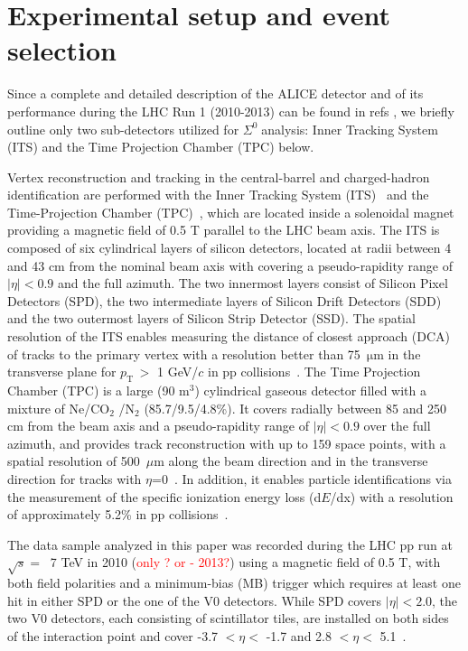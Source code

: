 \documentclass[ALICE,manyauthors]{cernphprep}
\newcommand{\sqs}{\ensuremath{\sqrt{s} =  \;\; }}
\newcommand{\sig}{\ensuremath{\Sigma^0  \; }}
\newcommand{\pt}{\ensuremath{p_{\mathrm{T}\; }}}
\newcommand{\red}{\textcolor{red}}
\begin{document}
 \section{ Experimental setup and event selection}
 \label{sec:exp}
 
Since a complete and detailed description of the ALICE detector and of its performance 
 during the LHC Run 1 (2010-2013) can be found in refs \cite{cite:ALICE,cite:ALICEPerformance}, 
 we briefly outline only two sub-detectors utilized for \sig analysis:
Inner Tracking System (ITS) and the Time Projection Chamber (TPC) below. 

Vertex reconstruction and tracking in the central-barrel  and charged-hadron identification are performed with the
Inner Tracking System (ITS)~\cite{cite:ALICE} and the Time-Projection Chamber (TPC)~\cite{cite:TPC}, 
which are located inside a solenoidal magnet providing a magnetic field of 0.5 T parallel to the LHC beam axis. 
The ITS is composed of six cylindrical layers of silicon detectors, located at radii between 4 and 43 cm from
the nominal beam axis with covering a pseudo-rapidity range of $|\eta|<0.9$ and the full azimuth. The two innermost layers
consist of Silicon Pixel Detectors (SPD), the two intermediate layers of Silicon Drift Detectors (SDD) and the two outermost
layers of Silicon Strip Detector (SSD). The spatial resolution of the ITS enables measuring the distance of closest approach 
(DCA) of tracks to the primary vertex with a resolution better than 75~$\mathrm{\mu}$m in the transverse plane for \pt $>$ 
1 GeV/$c$ in pp collisions~\cite{cite:Xi_c}. 
The Time Projection Chamber (TPC) is a large (90 m$^3$)
cylindrical gaseous detector filled with a mixture of Ne/CO$_2$ /N$_2$ (85.7/9.5/4.8\%). It covers radially between 85 and 250 cm from the 
beam axis and a pseudo-rapidity range of $|\eta| < 0.9$ over the full azimuth, and provides track reconstruction with up to 
159 space points, with a spatial resolution of 500~$\mu$m along the beam direction and in the transverse direction for tracks 
with $\eta$=0~\cite{cite:TPC}. In addition, it enables particle identifications via the measurement of the specific 
ionization energy loss (d$E$/dx) with a resolution of approximately 5.2\% in pp collisions~\cite{cite:ALICEPerformance}.

The data sample analyzed in this paper was recorded during the LHC pp run
at \sqs 7 TeV in 2010 (\red{only ? or - 2013?}) using a magnetic field of 0.5 T, with both field polarities 
and a minimum-bias (MB) trigger which requires at least one hit in either SPD or the one of the V0 detectors. While 
SPD covers $|\eta|<2.0$, the two V0 detectors, each consisting of scintillator tiles, are installed on both sides of the interaction 
point and cover -3.7 $< \eta <$ -1.7 and 2.8 $< \eta <$ 5.1~\cite{cite:ALICE2010-ChargeMult,cite:pi0-2012,
cite:ALICE2015-InclPhot-pp}.
\end{document}
